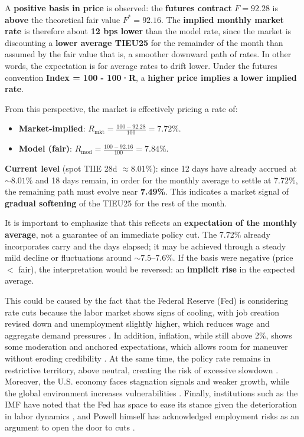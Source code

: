 \documentclass[11pt,a4paper]{article} %
\begin{document}
A \textbf{positive basis in price} is observed: the \textbf{futures contract} $F=92.28$ is \textbf{above} the theoretical fair value $F^*=92.16$. The \textbf{implied monthly market rate} is therefore about \textbf{12 bps lower} than the model rate, since the market is discounting a \textbf{lower average TIEU25} for the remainder of the month than assumed by the fair value that is, a smoother downward path of rates. In other words, the expectation is for average rates to drift lower. Under the futures convention \textbf{Index = 100 - 100·R}, a \textbf{higher price implies a lower implied rate}. 

From this perspective, the market is effectively pricing a rate of:
\begin{itemize}
  \item \textbf{Market-implied}: $R_{\text{mkt}} = \tfrac{100-92.28}{100} = \mathbf{7.72\%}$.
  \item \textbf{Model (fair)}: $R_{\text{mod}} = \tfrac{100-92.16}{100} = \mathbf{7.84\%}$.
\end{itemize}

\textbf{Current level} (spot TIIE 28d $\approx 8.01\%$): since 12 days have already accrued at $\sim8.01\%$ and 18 days remain, in order for the monthly average to settle at $7.72\%$, the remaining path must evolve near \textbf{7.49\%}. This indicates a market signal of \textbf{gradual softening} of the TIEU25 for the rest of the month.

It is important to emphasize that this reflects an \textbf{expectation of the monthly average}, not a guarantee of an immediate policy cut. The 7.72\% already incorporates carry and the days elapsed; it may be achieved through a steady mild decline or fluctuations around $\sim7.5$--$7.6\%$. If the basis were negative (price $<$ fair), the interpretation would be reversed: an \textbf{implicit rise} in the expected average.

This could be caused by the fact that the Federal Reserve (Fed) is considering rate cuts because the labor market shows signs of cooling, with job creation revised down and unemployment slightly higher, which reduces wage and aggregate demand pressures \citep{reuters2025a}. In addition, inflation, while still above 2\%, shows some moderation and anchored expectations, which allows room for maneuver without eroding credibility \citep{ycharts2025}. At the same time, the policy rate remains in restrictive territory, above neutral, creating the risk of excessive slowdown \citep{ycharts2025}. Moreover, the U.S. economy faces stagnation signals and weaker growth, while the global environment increases vulnerabilities \citep{reuters2025b}. Finally, institutions such as the IMF have noted that the Fed has space to ease its stance given the deterioration in labor dynamics \citep{reuters2025c}, and Powell himself has acknowledged employment risks as an argument to open the door to cuts \citep{reuters2025d}.
\end{document}
